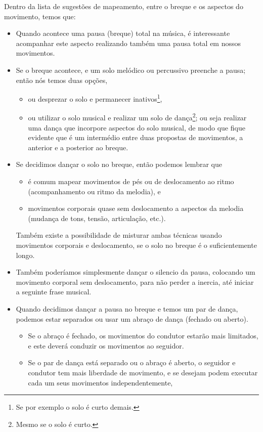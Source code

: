 Dentro da lista de sugestões de mapeamento, 
entre o breque e os aspectos do movimento, 
temos que:
\begin{itemize}
\item Quando acontece uma pausa (breque) total na música, 
é interessante acompanhar este aspecto realizando também uma pausa total em nossos movimentos.
\item Se o breque acontece,
e um solo melódico ou percussivo preenche a pausa;
então nós temos duas opções, 
\begin{itemize}
\item ou desprezar o solo e permanecer inativos\footnote{Se por exemplo o solo é curto demais.},
\item ou utilizar o solo musical e realizar um solo de dança\footnote{Mesmo se o solo é curto.};
ou seja realizar uma dança que incorpore aspectos do solo musical,
de modo que fique evidente que é um intermédio entre duas propostas de movimentos,
a anterior e a posterior ao breque.
\end{itemize}
\item Se decidimos dançar o solo no breque, 
então podemos lembrar que 
\begin{itemize}
\item é comum mapear movimentos de pés ou de deslocamento ao ritmo 
(acompanhamento ou ritmo da melodia), e 
\item movimentos corporais quase sem deslocamento a aspectos da melodia (mudança de tons, tensão, articulação, etc.).
\end{itemize}
Também existe a possibilidade de misturar ambas técnicas usando movimentos corporais e deslocamento,
se o solo no breque é o suficientemente longo.
\item Também poderíamos simplesmente dançar o silencio da pausa, colocando um movimento corporal sem deslocamento,
para não perder a inercia, até iniciar a seguinte frase musical.
\item Quando decidimos dançar a pausa no breque e temos um par de dança,
podemos estar separados ou usar um abraço de dança (fechado ou aberto).
\begin{itemize}
\item Se o abraço é fechado, os movimentos do condutor estarão mais limitados,
e este deverá conduzir os movimentos ao seguidor.
\item Se o par de dança está separado ou o abraço é aberto, 
o seguidor e condutor tem mais liberdade de movimento,
e se desejam podem executar cada um seus movimentos independentemente,

\end{itemize}
\end{itemize}
